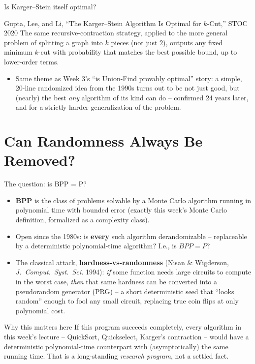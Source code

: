 \documentclass[11pt,aspectratio=169]{beamer}
\begin{document}
\begin{frame}{Is Karger--Stein itself optimal?}
  \begin{block}{Gupta, Lee, and Li, ``The Karger--Stein Algorithm Is Optimal for
  $k$-Cut,'' STOC 2020}
    The same recursive-contraction strategy, applied to the more general problem of
    splitting a graph into $k$ pieces (not just $2$), outputs any fixed minimum $k$-cut
    with probability that matches the best possible bound, up to lower-order terms.
  \end{block}
  \begin{itemize}
    \item Same theme as Week 3's ``is Union-Find provably optimal'' story: a simple,
    20-line randomized idea from the 1990s turns out to be not just good, but
    (nearly) the best \emph{any} algorithm of its kind can do -- confirmed 24 years
    later, and for a strictly harder generalization of the problem.
  \end{itemize}
\end{frame}

\section{Can Randomness Always Be Removed?}

\begin{frame}{The question: is BPP = P?}
  \small
  \begin{itemize}
    \item \textbf{BPP} is the class of problems solvable by a Monte Carlo algorithm
    running in polynomial time with bounded error (exactly this week's Monte Carlo
    definition, formalized as a complexity class).
    \item Open since the 1980s: is \textbf{every} such algorithm derandomizable --
    replaceable by a deterministic polynomial-time algorithm? I.e., is $BPP = P$?
    \item The classical attack, \textbf{hardness-vs-randomness} (Nisan \& Wigderson,
    \emph{J.\ Comput.\ Syst.\ Sci.} 1994): \emph{if} some function needs large circuits
    to compute in the worst case, \emph{then} that same hardness can be converted into a
    pseudorandom generator (PRG) -- a short deterministic seed that ``looks random''
    enough to fool any small circuit, replacing true coin flips at only polynomial cost.
  \end{itemize}
  \begin{alertblock}{Why this matters here}
    If this program succeeds completely, every algorithm in this week's lecture --
    QuickSort, Quickselect, Karger's contraction -- would have a deterministic
    polynomial-time counterpart with (asymptotically) the same running time. That is a
    long-standing \emph{research program}, not a settled fact.
  \end{alertblock}
\end{frame}
\end{document}
